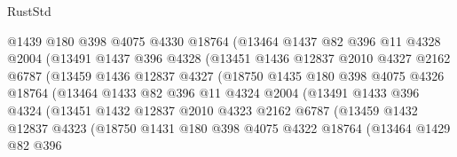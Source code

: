 \begin{lexlean}{RustStd}
\begin{coremodule}
                      @1439
                      @180
                      @398
                      @4075
                      @4330
                      @18764
                      (@13464
                        @1437
                        @82
                        @396
                        @11
                        @4328
                        @2004
                        (@13491
                          @1437
                          @396
                          @4328
                          (@13451
                            @1436
                            @12837
                            @2010
                            @4327
                            @2162
                            @6787
                            (@13459
                              @1436
                              @12837
                              @4327
                              (@18750
                                @1435
                                @180
                                @398
                                @4075
                                @4326
                                @18764
                                (@13464
                                  @1433
                                  @82
                                  @396
                                  @11
                                  @4324
                                  @2004
                                  (@13491
                                    @1433
                                    @396
                                    @4324
                                    (@13451
                                      @1432
                                      @12837
                                      @2010
                                      @4323
                                      @2162
                                      @6787
                                      (@13459
                                        @1432
                                        @12837
                                        @4323
                                        (@18750
                                          @1431
                                          @180
                                          @398
                                          @4075
                                          @4322
                                          @18764
                                          (@13464
                                            @1429
                                            @82
                                            @396

\end{coremodule}
\end{lexlean}
